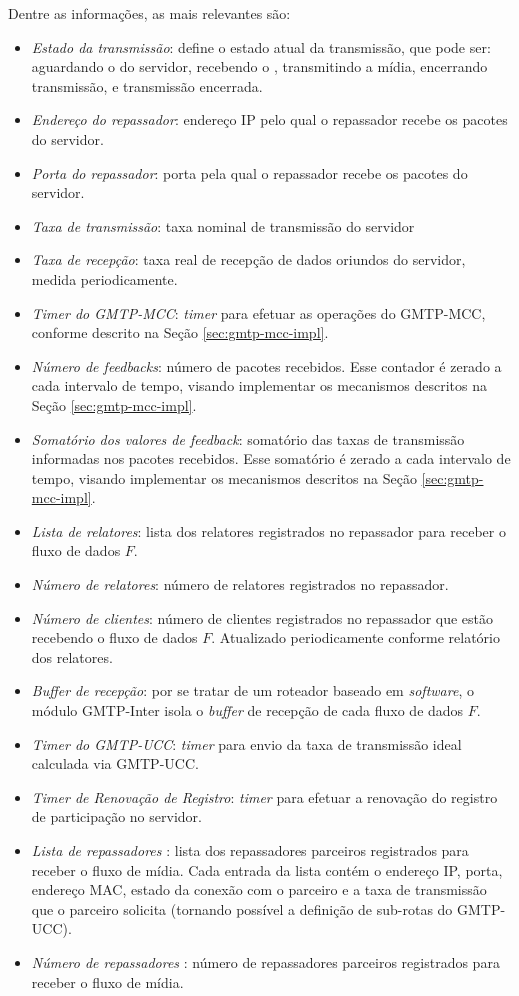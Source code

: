 Dentre as informações, as mais relevantes são:
\begin{itemize}	
	\item \textit{Estado da transmissão}: define o estado atual da transmissão, que pode ser: aguardando o  do servidor, recebendo o , transmitindo a mídia, encerrando transmissão, e transmissão encerrada.
	\item \textit{Endereço do repassador}: endereço IP pelo qual o repassador recebe os pacotes do servidor.
	\item \textit{Porta do repassador}: porta pela qual o repassador recebe os pacotes do servidor. 
	\item \textit{Taxa de transmissão}: taxa nominal de transmissão do servidor
	\item \textit{Taxa de recepção}: taxa real de recepção de dados oriundos do servidor, medida periodicamente.
	\item \textit{Timer do GMTP-MCC}: \textit{timer} para efetuar as operações do GMTP-MCC, conforme descrito na Seção \ref{sec:gmtp-mcc-impl}.
	\item \textit{Número de \textit{feedbacks}}: número de pacotes  recebidos. Esse contador é zerado a cada intervalo de tempo, visando implementar os mecanismos descritos na Seção \ref{sec:gmtp-mcc-impl}.
	\item \textit{Somatório dos valores de \textit{feedback}}: somatório das taxas de transmissão informadas nos pacotes  recebidos. Esse somatório é zerado a cada intervalo de tempo, visando implementar os mecanismos descritos na Seção \ref{sec:gmtp-mcc-impl}.
	\item \textit{Lista de relatores}: lista dos relatores registrados no repassador para receber o fluxo de dados $F$.
	\item \textit{Número de relatores}: número de relatores registrados no repassador.
	\item \textit{Número de clientes}: número de clientes registrados no repassador que estão recebendo o fluxo de dados $F$. Atualizado periodicamente conforme relatório dos relatores.
	\item \textit{Buffer de recepção}: por se tratar de um roteador baseado em \textit{software}, o módulo GMTP-Inter isola o \textit{buffer} de recepção de cada fluxo de dados $F$.
	\item \textit{Timer do GMTP-UCC}: \textit{timer} para envio da taxa de transmissão ideal calculada via GMTP-UCC.
	\item \textit{Timer de Renovação de Registro}: \textit{timer} para efetuar a renovação do registro de participação no servidor.
	\item \textit{Lista de repassadores }: lista dos repassadores parceiros registrados para receber o fluxo de mídia.
	Cada entrada da lista contém o endereço IP, porta, endereço MAC, estado da conexão com o parceiro e a taxa de transmissão que o parceiro solicita (tornando possível a definição de sub-rotas do GMTP-UCC).
	\item \textit{Número de repassadores }: número de repassadores parceiros registrados para receber o fluxo de mídia.
\end{itemize}
